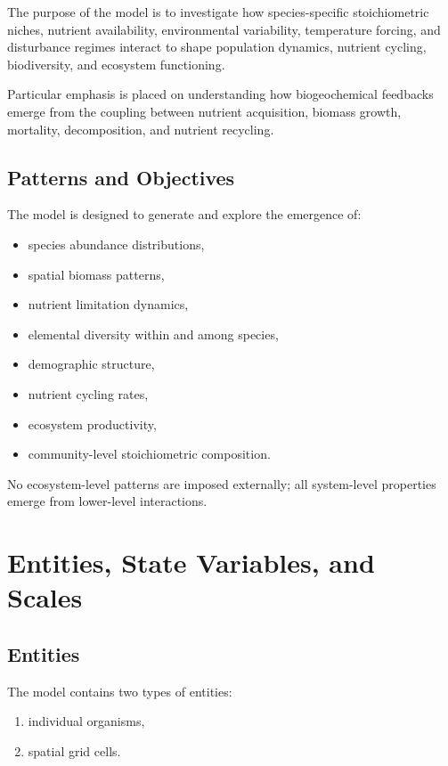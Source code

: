 The purpose of the model is to investigate how species-specific stoichiometric niches, nutrient availability, environmental variability, temperature forcing, and disturbance regimes interact to shape population dynamics, nutrient cycling, biodiversity, and ecosystem functioning.

Particular emphasis is placed on understanding how biogeochemical feedbacks emerge from the coupling between nutrient acquisition, biomass growth, mortality, decomposition, and nutrient recycling.

\subsection{Patterns and Objectives}

The model is designed to generate and explore the emergence of:

\begin{itemize}
\item species abundance distributions,
\item spatial biomass patterns,
\item nutrient limitation dynamics,
\item elemental diversity within and among species,
\item demographic structure,
\item nutrient cycling rates,
\item ecosystem productivity,
\item community-level stoichiometric composition.
\end{itemize}

No ecosystem-level patterns are imposed externally; all system-level properties emerge from lower-level interactions.


\section{Entities, State Variables, and Scales}


\subsection{Entities}

The model contains two types of entities:

\begin{enumerate}
\item individual organisms,
\item spatial grid cells.
\end{enumerate}

